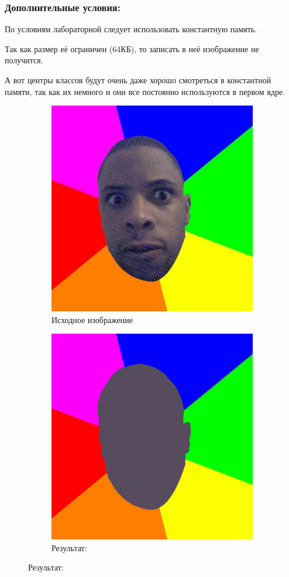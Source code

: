 \documentclass[12pt]{article}
\begin{document}
\subsubsection*{Дополнительные условия:}

По условиям лабораторной следует использовать константную память.

Так как размер её ограничен (64КБ), то записать в неё изображение не получится.

А вот центры классов будут очень даже хорошо смотреться в константной памяти,
так как их немного и они все постоянно используются в первом ядре.

{
}

\newpage


\begin{figure}[!tbh]
	\caption*{Малое изображение: 400x408}
	\begin{subfigure}{0.49\textwidth}
		\centering
		\caption*{Исходное изображение}
		\includegraphics[scale=0.4]{../test/images/nigger.png}
	\end{subfigure}
	\begin{subfigure}{0.49\textwidth}
		\centering
		\caption*{Результат:}
		\includegraphics[scale=0.4]{t3-res.png}

\end{subfigure}
\end{figure}
\end{document}
